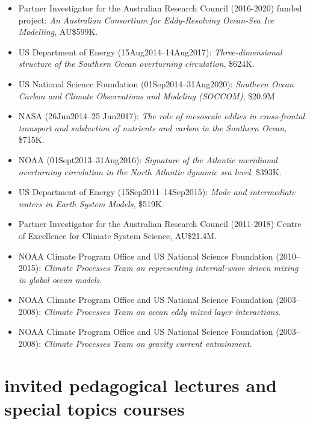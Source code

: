 \documentclass{article}
\begin{document}
\begin{itemize}[leftmargin=*]
\item Partner Investigator for the  Australian Research Council (2016-2020) funded project: {\it An Australian Consortium for Eddy-Resolving Ocean-Sea Ice Modelling}, AU\$599K.

\item US Department of Energy (15Aug2014--14Aug2017): {\it Three-dimensional structure of the Southern Ocean overturning circulation},  \$624K.

\item US National Science Foundation (01Sep2014--31Aug2020): {\it Southern Ocean Carbon and Climate Observations and Modeling (SOCCOM)}, \$20.9M

\item NASA (26Jun2014--25 Jun2017): {\it The role of mesoscale eddies in cross-frontal transport and subduction of nutrients and carbon in the Southern Ocean}, \$715K.

\item NOAA (01Sept2013--31Aug2016): {\it Signature of the Atlantic meridional overturning circulation in the North Atlantic dynamic sea level}, \$393K.

\item US Department of Energy (15Sep2011--14Sep2015): {\it Mode and intermediate waters in Earth System Models}, \$519K.

\item Partner Investigator for the Australian Research Council (2011-2018) Centre of Excellence for Climate System Science, AU\$21.4M.
  
\item NOAA Climate Program Office and US National Science Foundation (2010--2015): {\it Climate Processes Team on representing internal-wave driven mixing in global ocean models}.

\item NOAA Climate Program Office and US National Science Foundation (2003--2008): {\it Climate Processes Team on ocean eddy mixed layer interactions}.

\item NOAA Climate Program Office and US National Science Foundation (2003--2008): {\it Climate Processes Team on gravity current entrainment}.

\end{itemize}


\section*{\sc  \color{Maroon}  invited pedagogical lectures and special topics courses}
\vspace{-.3cm}
\end{document}

